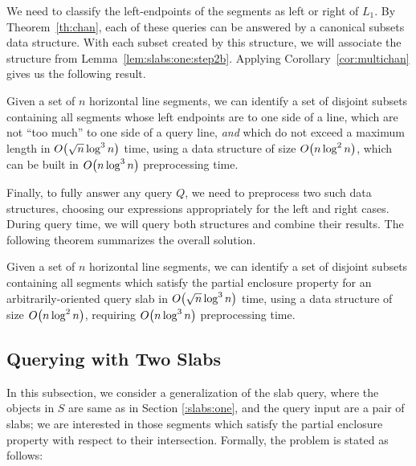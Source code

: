 
We need to classify the left-endpoints of the segments as left or right of 
$L_1$. 
By Theorem~\ref{th:chan}, each of these queries can be answered by a canonical 
subsets data structure.
With each subset created by this structure, we will associate the structure from 
Lemma~\ref{lem:slabs:one:step2b}. 
Applying Corollary~\ref{cor:multichan} gives us the following result.

\begin{lemma}
\label{lem:slabs:one:step3}
Given a set of $n$ horizontal line segments, we can identify a set of disjoint 
subsets containing all segments whose left endpoints are to one side of a line, 
which are not ``too much'' to one side of a query line, \emph{and} which do not 
exceed a maximum length in $O\!\left(\sqrt{n}\log^3{n}\right)$ time, using a data 
structure of size $O\!\left(n\log^2{n}\right)$, which can be built in 
$O\!\left(n\log^3{n}\right)$ preprocessing time.
\end{lemma}


Finally, to fully answer any query $Q$, we need to preprocess two such data structures, 
choosing our expressions appropriately for the left and right cases.
During query time, we will query both structures and combine their results.
The following theorem summarizes the overall solution.

\begin{theorem}
\label{th:slabs:one}
Given a set of $n$ horizontal line segments, we can identify a set of disjoint 
subsets containing all segments which satisfy the partial enclosure property for 
an arbitrarily-oriented query slab in $O\!\left(\sqrt{n}\log^3{n}\right)$ time, using a 
data structure of size $O\!\left(n\log^2{n}\right)$, requiring $O\!\left(n\log^3{n}\right)$ 
preprocessing time.
\end{theorem}


\subsection{Querying with Two Slabs}
\label{:slabs:two}

In this subsection, we consider a generalization of the slab query, where 
the objects in $S$ are same as in Section \ref{:slabs:one}, and the  
query input are a pair of slabs; we are interested in those segments 
which satisfy the partial enclosure property with respect to their intersection.
Formally, the problem is stated as follows:


